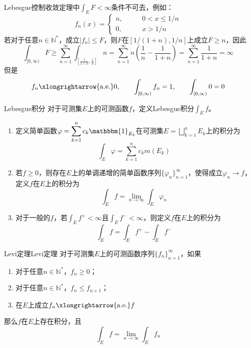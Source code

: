\documentclass[lang = cn, scheme = chinese, thmcnt = section]{elegantbook}
\newcommand{\N}{\mathbb{N}}            %
\newcommand{\dis}{\displaystyle}
\newcommand{\toae}{\xlongrightarrow{\mathrm{a.e.}}}
\begin{document}
\begin{remark}
	Lebesgue控制收敛定理中$\dis\int_E F<\infty$条件不可去，例如：%
	$$
	f_n(x)=\begin{cases}
		n,\qquad & 0<x\le 1/n\\
		0,\qquad & x>1/n
	\end{cases}
	$$
	若对于任意$n\in\N^*$，成立$|f_n|\le F$，则$F$在$[1/(1+n),1/n]$上成立$F\ge n$，因此%
	$$
	\int_{[0,\infty)}F
	\ge\sum_{n=1}^{\infty}\int_{\left[\frac{1}{1+n},\frac{1}{n}\right]}n
	=\sum_{n=1}^{\infty}n\left(\frac{1}{n}-\frac{1}{1+n}\right)
	=\sum_{n=1}^{\infty}\frac{1}{1+n}
	=\infty
	$$
	但是%
	$$
	f_n\toae 0,\qquad
	\int_{[0,\infty)}f_n=1,\qquad
	\int_{[0,\infty)}0=0
	$$
\end{remark}

\begin{definition}{Lebesgue积分}
	对于可测集$E$上的可测函数$f$，定义Lebesgue积分$\int_E f$。
	\begin{enumerate}
		\item 定义简单函数$\dis \varphi=\sum_{k=1}^{n}{c_k\mathbbm{1}_{E_k}}$在可测集$\dis E=\bigsqcup\limits_{k=1}^{n} E_k$上的积分为%
		$$
		\int_E\varphi=\sum_{k=1}^{n}c_km(E_k)
		$$
		\item 若$f\ge 0$，则存在$E$上的单调递增的简单函数序列$\{ \varphi_n \}_{n=1}^{\infty}$，使得成立$\varphi_n\to f$，定义$f$在$E$上的积分为
		$$
		\int_Ef=\lim_{n\to\infty}\int_E\varphi_n
		$$
		\item 对于一般的$f$，若$\dis \int_Ef^+<\infty$且$\dis \int_Ef^-<\infty$，则定义$f$在$E$上的积分为
		$$
		\int_Ef=\int_Ef^+-\int_Ef^-
		$$
	\end{enumerate}
\end{definition}

\begin{theorem}{Levi定理}{Levi定理}
	对于可测集$E$上的可测函数序列$\{ f_n \}_{n=1}^{\infty}$，如果
	\begin{enumerate}
		\item 对于任意$n\in\N^*$，$f_n\ge 0$；
		\item 对于任意$n\in\N^*$，$f_n\le f_{n+1}$；
		\item 在$E$上成立$f_n\toae f$
	\end{enumerate}
	那么$f$在$E$上存在积分，且
	$$
	\int_Ef=\lim_{n\to\infty}\int_Ef_n
	$$
\end{theorem}
\end{document}
